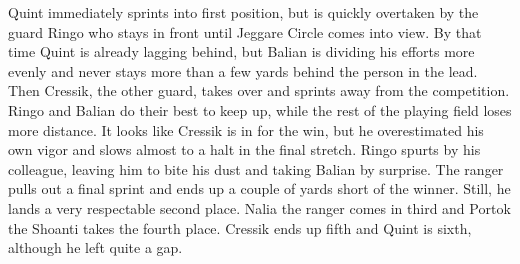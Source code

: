Quint immediately sprints into first position, but is quickly overtaken by the guard Ringo who stays in front until Jeggare Circle comes into view. By that time Quint is already lagging behind, but Balian is dividing his efforts more evenly and never stays more than a few yards behind the person in the lead. Then Cressik, the other guard, takes over and sprints away from the competition. Ringo and Balian do their best to keep up, while the rest of the playing field loses more distance. It looks like Cressik is in for the win, but he overestimated his own vigor and slows almost to a halt in the final stretch. Ringo spurts by his colleague, leaving him to bite his dust and taking Balian by surprise. The ranger pulls out a final sprint and ends up a couple of yards short of the winner. Still, he lands a very respectable second place. Nalia the ranger comes in third and Portok the Shoanti takes the fourth place. Cressik ends up fifth and Quint is sixth, although he left quite a gap.\\

